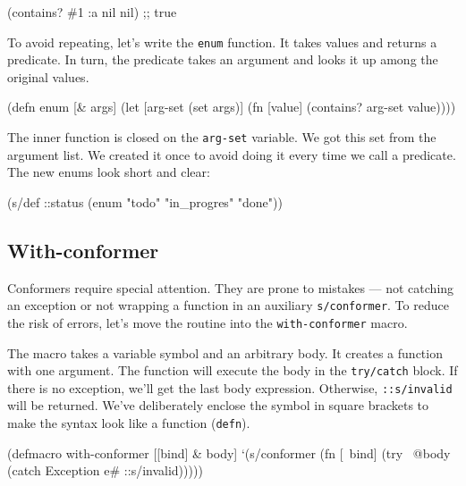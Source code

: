 \begin{english}
  \begin{clojure}
(contains? #{1 :a nil} nil) ;; true
  \end{clojure}
\end{english}

To avoid repeating, let's write the \verb|enum| function. It takes values and returns a predicate. In turn, the predicate takes an argument and looks it up among the original values.

\begin{english}
  \begin{clojure}
(defn enum [& args]
  (let [arg-set (set args)]
    (fn [value]
      (contains? arg-set value))))
  \end{clojure}
\end{english}

The inner function is closed on the \verb|arg-set| variable. We got this set from the argument list. We created it once to avoid doing it every time we call a predicate. The new enums look short and clear:

\begin{english}
  \begin{clojure}
(s/def ::status
  (enum "todo"
        "in_progres"
        "done"))
  \end{clojure}
\end{english}

\subsection{With-conformer}


Conformers require special attention. They are prone to mistakes — not catching an exception or not wrapping a function in an auxiliary \verb|s/conformer|. To reduce the risk of errors, let's move the routine into the \verb|with-conformer| macro.

The macro takes a variable symbol and an arbitrary body. It creates a function with one argument. The function will execute the body in the \verb|try/catch| block. If there is no exception, we'll get the last body expression. Otherwise, \verb|::s/invalid| will be returned. We've deliberately enclose the symbol in square brackets to make the syntax look like a function (\verb|defn|).

\begin{english}
  \begin{clojure}
(defmacro with-conformer
  [[bind] & body]
  `(s/conformer
    (fn [~bind]
      (try
        ~@body
        (catch Exception e#
          ::s/invalid)))))
  \end{clojure}
\end{english}

